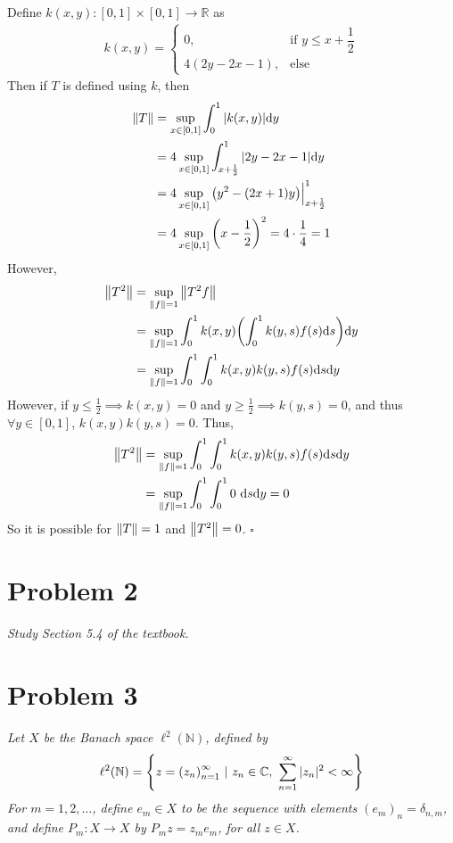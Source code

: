 \documentclass[12pt]{article}
\theoremstyle{plain}
\begin{document}
Define $k(x,y) : [0,1] \times [0,1] \rightarrow \mathbb{R}$ as
\begin{align*}
    k(x,y) = \left\{\begin{array}{ll}
        0, & \text{if } y \leq x + \dfrac{1}{2} \\
        4(2y - 2x - 1), & \text{else}
    \end{array}\right.
\end{align*}
Then if $T$ is defined using $k$, then
\begin{align*}
    \norm{T} &= \sup\limits_{x\in[0,1]}\int_0^1|k(x,y)|\dd y \\
    &= 4\sup_{x\in[0,1]}\int_{x + \frac{1}{2}}^1 |2y - 2x - 1| \dd y \\
    &= 4\sup_{x\in[0,1]} \qty(y^2 - (2x + 1)y)\Big|_{x + \frac{1}{2}}^1 \\
    &= 4\sup_{x\in[0,1]} \qty(x - \frac{1}{2})^2 = 4\cdot\frac{1}{4} = 1
\end{align*}
However,
\begin{align*}
    \norm{T^2} &= \sup\limits_{\norm{f}=1}\norm{T^2f} \\
    &= \sup_{\norm{f}=1}\int_0^1 k(x,y)\qty(\int_0^1 k(y,s) f(s) \dd s) \dd y \\
    &= \sup_{\norm{f}=1}\int_0^1 \int_0^1 k(x,y)k(y,s) f(s) \dd s \dd y
\end{align*}
However, if $y \leq \frac{1}{2} \implies k(x,y) = 0$ and $y \geq \frac{1}{2} \implies k(y,s) = 0$, and thus $\forall y \in [0,1]$, $k(x,y)k(y,s) = 0$.  Thus,
\begin{align*}
    \norm{T^2} &= \sup_{\norm{f}=1}\int_0^1\int_0^1 k(x,y)k(y,s)f(s) \dd s \dd y \\
    &= \sup_{\norm{f}=1} \int_0^1\int_0^1 0\ \dd s \dd y = 0
\end{align*}
So it is possible for $\norm{T} = 1$ and $\norm{T^2} = 0$. \hfill $\square$

\section*{Problem 2}
\emph{Study Section 5.4 of the textbook.}

\section*{Problem 3}
\emph{Let $X$ be the Banach space $\ell^2(\mathbb{N})$, defined by}
\begin{align*}
    \ell^2(\mathbb{N}) = \left\{z = \qty(z_n)_{n=1}^\infty\ |\ z_n \in \mathbb{C},\ \sum_{n=1}^\infty |z_n|^2 < \infty\right\}
\end{align*}
\emph{For $m=1,2, \dots$, define $e_m \in X$ to be the sequence with elements $(e_m)_n = \delta_{n,m}$, and define $P_m: X \rightarrow X$ by $P_m z = z_m e_m$, for all $z \in X$.} 
\end{document}

